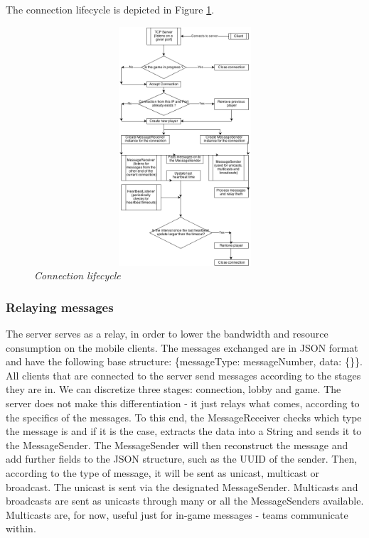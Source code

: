 \documentclass{article}
\begin{document}
The connection lifecycle is depicted in Figure \ref{fig:connectionLifecycle}.

\begin{figure}
\includegraphics[height=3.5in,width=6.23in]{./images/diagrams/connection_lifecycle.png}  
\caption{\small \sl Connection lifecycle \label{fig:connectionLifecycle}}
\end{figure}

\subsubsection{Relaying messages}

The server serves as a relay, in order to lower the bandwidth and
resource consumption on the mobile clients. The messages exchanged are in
JSON format and have the following base structure: \{messageType: messageNumber,
data: \{\}\}. All clients that are connected to the server send messages
according to the stages they are in. We can discretize three stages: connection,
lobby and game. The server does not make this differentiation - it just relays
what comes, according to the specifics of the messages. To this end, the
MessageReceiver checks which type the message is and if it is the case, extracts
the data into a String and sends it to the MessageSender. The MessageSender will
then reconstruct the message and add further fields to the JSON structure, such
as the UUID of the sender. Then, according to the type of message, it will be
sent as unicast, multicast or broadcast. The unicast is sent via the designated
MessageSender. Multicasts and broadcasts are sent as unicasts through many or
all the MessageSenders available. Multicasts are, for now, useful just for
in-game messages - teams communicate within.\newline
\end{document}
